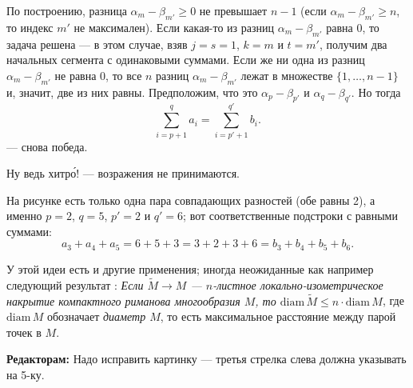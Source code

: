 По построению, разница $\alpha_m-\beta_{m'}\ge 0$ не превышает $n-1$ 
(если $\alpha_m-\beta_{m'}\ge n$, то индекс $m'$ не максимален).
Если какая-то из разниц $\alpha_m-\beta_{m'}$ равна $0$, то задача решена --- в этом случае, взяв $j=s=1$, $k=m$ и $t=m'$, получим два начальных сегмента с одинаковыми суммами.
Если же ни одна из разниц $\alpha_m-\beta_{m'}$ не равна $0$, то все $n$ разниц 
$\alpha_m-\beta_{m'}$ лежат в множестве $\{1,\dots,n-1\}$ и, значит, две из них равны.
Предположим, что это $\alpha_p-\beta_{p'}$ и $\alpha_q-\beta_{q'}$.
Но тогда 
\[\sum_{i=p+1}^qa_i=\sum_{i=p'+1}^{q'}b_i.\]
--- снова победа.

Ну ведь хитр\'{о}! --- возражения не принимаются.

На рисунке есть только одна пара совпадающих разностей (обе равны 2), а именно $p=2$, $q=5$, $p'=2$ и $q'=6$;
вот соответственные подстроки с равными суммами:
\[a_3+a_4+a_5=6+5+3=3+2+3+6=b_3+b_4+b_5+b_6.\]

\begin{addedbytheeditors}
У этой идеи есть и другие применения; иногда неожиданные как например следующий результат \cite{petrunin}:
\textit{Если $\tilde M\to M$ --- $n$-листное локально-изометрическое накрытие компактного риманова многообразия $M$, то $\mathrm{diam}\, \tilde M\le n\cdot \mathrm{diam}\, M$}, где $\mathrm{diam}\, M$ обозначает \textit{диаметр $M$}, то есть максимальное расстояние между парой точек в $M$.

\textbf{Редакторам:} Надо исправить картинку --- третья стрелка слева должна указывать на 5-ку. 
\end{addedbytheeditors}
